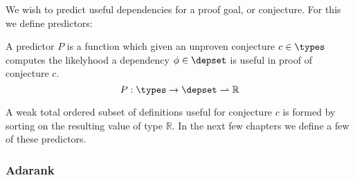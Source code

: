 We wish to predict useful dependencies for a proof goal, or conjecture.
For this we define predictors:

\begin{definition}
  A predictor $P$ is a function which given an unproven conjecture $c \in \types$
  computes the likelyhood a dependency $\phi \in \depset$ is useful in proof of conjecture $c$.
  $$
    P : \types \rightarrow \depset \rightharpoonup \mathbb{R}
  $$
\end{definition}

A weak total ordered subset of definitions useful for conjecture $c$ is formed by sorting on the resulting value of type $\mathbb{R}$.
In the next few chapters we define a few of these predictors.

\subsubsection{\knn}


\subsubsection{\knnadaptive}


\subsubsection{\nb}


\subsubsection{Adarank}

